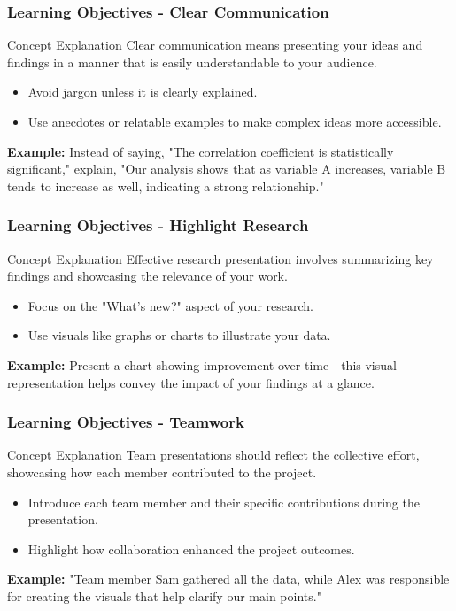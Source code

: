 \documentclass{beamer}
\begin{document}
\begin{frame}[fragile]
    \frametitle{Learning Objectives - Clear Communication}
    \begin{block}{Concept Explanation}
        Clear communication means presenting your ideas and findings in a manner that is easily understandable to your audience. 
    \end{block}
    \begin{itemize}
        \item Avoid jargon unless it is clearly explained.
        \item Use anecdotes or relatable examples to make complex ideas more accessible.
    \end{itemize}
    \textbf{Example:} Instead of saying, "The correlation coefficient is statistically significant," explain, "Our analysis shows that as variable A increases, variable B tends to increase as well, indicating a strong relationship."
\end{frame}

\begin{frame}[fragile]
    \frametitle{Learning Objectives - Highlight Research}
    \begin{block}{Concept Explanation}
        Effective research presentation involves summarizing key findings and showcasing the relevance of your work.
    \end{block}
    \begin{itemize}
        \item Focus on the "What's new?" aspect of your research.
        \item Use visuals like graphs or charts to illustrate your data.
    \end{itemize}
    \textbf{Example:} Present a chart showing improvement over time—this visual representation helps convey the impact of your findings at a glance.
\end{frame}

\begin{frame}[fragile]
    \frametitle{Learning Objectives - Teamwork}
    \begin{block}{Concept Explanation}
        Team presentations should reflect the collective effort, showcasing how each member contributed to the project.
    \end{block}
    \begin{itemize}
        \item Introduce each team member and their specific contributions during the presentation.
        \item Highlight how collaboration enhanced the project outcomes.
    \end{itemize}
    \textbf{Example:} "Team member Sam gathered all the data, while Alex was responsible for creating the visuals that help clarify our main points."
\end{frame}
\end{document}

